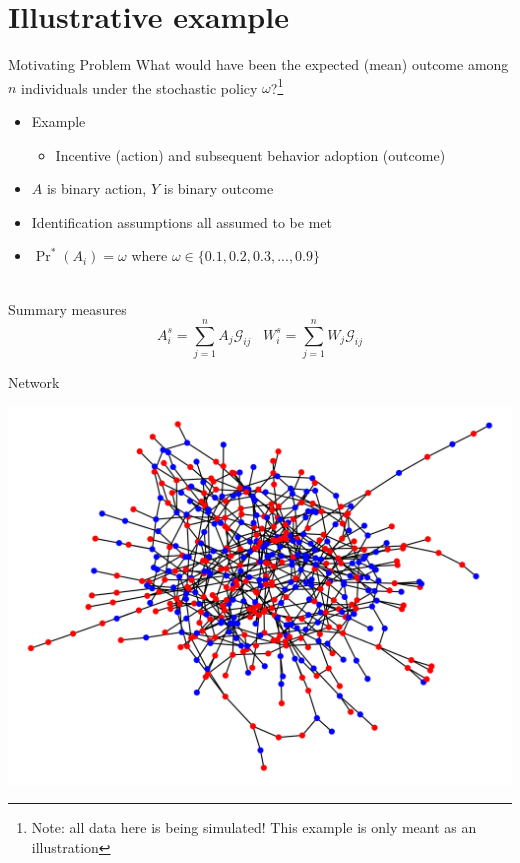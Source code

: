 \documentclass{beamer}
\begin{document}
\section{Illustrative example}

\begin{frame}{Motivating Problem}
	What would have been the expected (mean) outcome among $n$ individuals under the stochastic policy $\omega$?\footnote[frame]{Note: all data here is being simulated! This example is only meant as an illustration}
	\begin{itemize}
		\item Example
		\begin{itemize}
			\item Incentive (action) and subsequent behavior adoption (outcome)
		\end{itemize}
		\item $A$ is binary action, $Y$ is binary outcome
		\item Identification assumptions all assumed to be met
		\item $\Pr^*(A_i) = \omega$ where $\omega \in \{0.1, 0.2, 0.3, ..., 0.9\}$
	\end{itemize}~\\
	Summary measures
	\[A_i^s = \sum_{j=1}^{n} A_j \mathcal{G}_{ij} \;\;\; W_i^s = \sum_{j=1}^{n} W_j \mathcal{G}_{ij}\]
\end{frame}

\begin{frame}{Network}
	\begin{center}
		\includegraphics[scale=0.5]{images/example_network.png}
	\end{center}
\end{frame}
\end{document}
